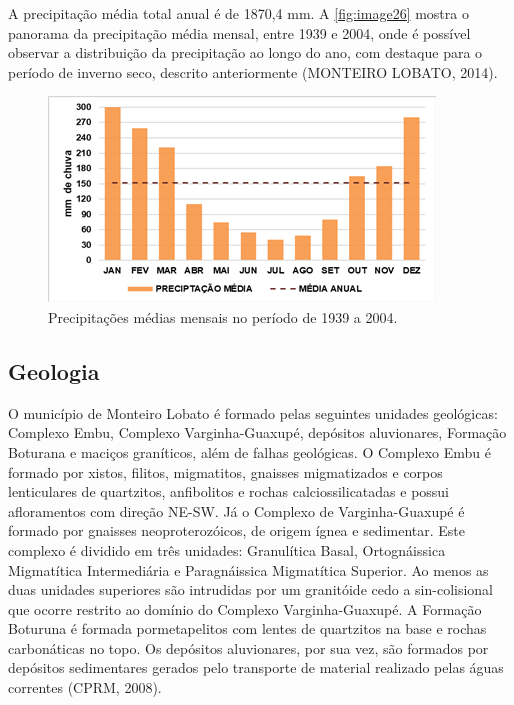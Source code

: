 A precipitação média total anual é de 1870,4 mm. A \autoref{fig:image26} mostra o panorama da precipitação média mensal, entre 1939 e 2004, onde é possível observar a distribuição da precipitação ao longo do ano, com destaque para o período de inverno seco, descrito anteriormente (MONTEIRO LOBATO, 2014).

 \begin{figure}[h!]
	\centering
	\includegraphics[width=1\linewidth]{produtos/proddois/image26}
	\caption{Precipitações médias mensais no período de 1939 a 2004.}
	\label{fig:image26}
\end{figure}

\subsection{Geologia}

O município de Monteiro Lobato é formado pelas seguintes unidades geológicas: Complexo Embu, Complexo Varginha-Guaxupé, depósitos aluvionares, Formação Boturana e maciços graníticos, além de falhas geológicas. O Complexo Embu é formado por xistos, filitos, migmatitos, gnaisses migmatizados e corpos lenticulares de quartzitos, anfibolitos e rochas calciossilicatadas e possui afloramentos com direção NE-SW. Já o Complexo de Varginha-Guaxupé é formado por gnaisses neoproterozóicos, de origem ígnea e sedimentar. Este complexo é dividido em três unidades: Granulítica Basal, Ortognáissica Migmatítica Intermediária e Paragnáissica Migmatítica Superior.  Ao menos as duas unidades superiores são intrudidas por um granitóide cedo a sin-colisional que ocorre restrito ao domínio do Complexo Varginha-Guaxupé. A Formação Boturuna é formada pormetapelitos com lentes de quartzitos na base e rochas carbonáticas no topo. Os depósitos aluvionares, por sua vez, são formados por depósitos sedimentares gerados pelo transporte de material realizado pelas águas correntes (CPRM, 2008).

